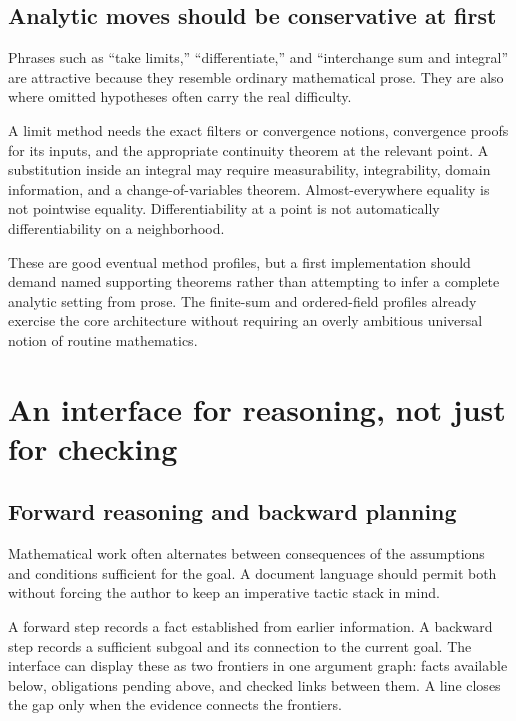 \documentclass[11pt,a4paper]{article}
\begin{document}
\subsection{Analytic moves should be conservative at first}

Phrases such as ``take limits,'' ``differentiate,'' and ``interchange sum and integral'' are attractive because they resemble ordinary mathematical prose. They are also where omitted hypotheses often carry the real difficulty.

A limit method needs the exact filters or convergence notions, convergence proofs for its inputs, and the appropriate continuity theorem at the relevant point. A substitution inside an integral may require measurability, integrability, domain information, and a change-of-variables theorem. Almost-everywhere equality is not pointwise equality. Differentiability at a point is not automatically differentiability on a neighborhood.

These are good eventual method profiles, but a first implementation should demand named supporting theorems rather than attempting to infer a complete analytic setting from prose. The finite-sum and ordered-field profiles already exercise the core architecture without requiring an overly ambitious universal notion of routine mathematics.

\section{An interface for reasoning, not just for checking}
\label{sec:interface}

\subsection{Forward reasoning and backward planning}

Mathematical work often alternates between consequences of the assumptions and conditions sufficient for the goal. A document language should permit both without forcing the author to keep an imperative tactic stack in mind.

A forward step records a fact established from earlier information. A backward step records a sufficient subgoal and its connection to the current goal. The interface can display these as two frontiers in one argument graph: facts available below, obligations pending above, and checked links between them. A line closes the gap only when the evidence connects the frontiers.
\end{document}
